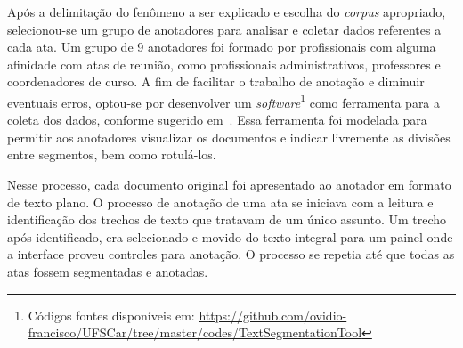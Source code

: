 Após a delimitação do fenômeno a ser explicado e escolha do \textit{corpus} apropriado, selecionou-se um grupo de anotadores para analisar e coletar dados referentes a cada ata. Um grupo de 9 anotadores foi formado por profissionais com alguma afinidade com atas de reunião, como profissionais administrativos, professores e coordenadores de curso. 
A fim de facilitar o trabalho de anotação e diminuir eventuais erros, optou-se por desenvolver um \textit{software}\footnote{Códigos fontes disponíveis em: \url{https://github.com/ovidio-francisco/UFSCar/tree/master/codes/TextSegmentationTool} } como ferramenta para a coleta dos dados, conforme sugerido em~\cite{Hovy2010}.  
Essa ferramenta foi modelada para permitir aos anotadores visualizar os documentos e indicar livremente as divisões entre segmentos, bem como rotulá-los.  

Nesse processo, cada documento original foi apresentado ao anotador em formato de texto plano. O processo de anotação de uma ata se iniciava com a leitura e identificação dos trechos de texto que tratavam de um único assunto. Um trecho após identificado, era selecionado e movido do texto integral para um painel onde a interface proveu controles para anotação. O processo se repetia até que todas as atas fossem segmentadas e anotadas.






